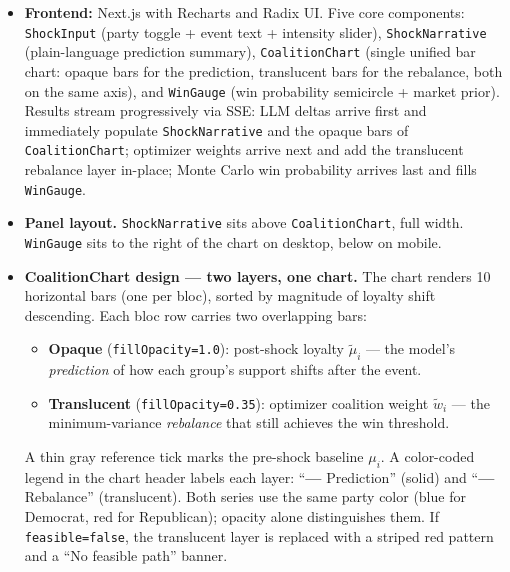 \documentclass[11pt]{article}
\begin{document}
\medskip
\begin{itemize}[leftmargin=1.6em, itemsep=3pt]
  \item \textbf{Frontend:} Next.js with Recharts and Radix UI. Five core components:
        \texttt{ShockInput} (party toggle + event text + intensity slider),
        \texttt{ShockNarrative} (plain-language prediction summary),
        \texttt{CoalitionChart} (single unified bar chart: opaque bars for the
        prediction, translucent bars for the rebalance, both on the same axis),
        and \texttt{WinGauge} (win probability semicircle + market prior).
        Results stream progressively via SSE: LLM deltas arrive first and
        immediately populate \texttt{ShockNarrative} and the opaque bars of
        \texttt{CoalitionChart}; optimizer weights arrive next and add the
        translucent rebalance layer in-place; Monte Carlo win probability
        arrives last and fills \texttt{WinGauge}.

  \item \textbf{Panel layout.} \texttt{ShockNarrative} sits above
        \texttt{CoalitionChart}, full width. \texttt{WinGauge} sits to the
        right of the chart on desktop, below on mobile.

  \item \textbf{CoalitionChart design --- two layers, one chart.}
        The chart renders 10 horizontal bars (one per bloc), sorted by
        magnitude of loyalty shift descending. Each bloc row carries two
        overlapping bars:
        \begin{itemize}[leftmargin=1.6em, itemsep=1pt]
          \item \textbf{Opaque} (\texttt{fillOpacity=1.0}): post-shock loyalty
                $\tilde{\mu}_i$ --- the model's \emph{prediction} of how each
                group's support shifts after the event.
          \item \textbf{Translucent} (\texttt{fillOpacity=0.35}): optimizer
                coalition weight $\tilde{w}_i$ --- the minimum-variance
                \emph{rebalance} that still achieves the win threshold.
        \end{itemize}
        A thin gray reference tick marks the pre-shock baseline $\mu_i$.
        A color-coded legend in the chart header labels each layer:
        ``\textbf{---} Prediction'' (solid) and
        ``\textbf{---} Rebalance'' (translucent). Both series use the same
        party color (blue for Democrat, red for Republican); opacity alone
        distinguishes them. If \texttt{feasible=false}, the translucent layer
        is replaced with a striped red pattern and a ``No feasible path'' banner.


\end{itemize}
\end{document}
